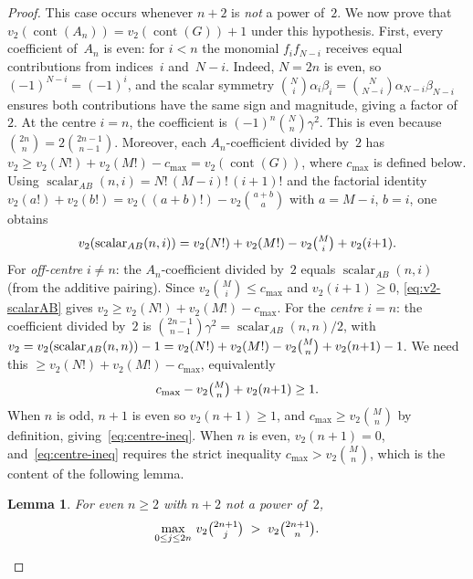 \documentclass[10pt]{amsart}
\newtheorem{lemma}[theorem]{Lemma}
\theoremstyle{definition}
\theoremstyle{remark}
\DeclareMathOperator{\cont}{cont}
\begin{document}
\begin{proof}
This case occurs whenever $n+2$ is \emph{not} a power of~$2$.
We now prove that $v_2(\cont(A_n)) = v_2(\cont(G))+1$ under this
hypothesis.  First, every coefficient of~$A_n$ is even: for $i<n$
the monomial $f_if_{N-i}$ receives equal contributions from
indices~$i$ and~$N{-}i$.  Indeed, $N=2n$ is even, so
$(-1)^{N-i}=(-1)^i$, and the scalar symmetry
$\binom{N}{i}\alpha_i\beta_i = \binom{N}{N{-}i}\alpha_{N-i}\beta_{N-i}$
ensures both contributions have the same sign and magnitude,
giving a factor of~$2$.  At the centre $i=n$, the coefficient is
$(-1)^n\binom{N}{n}\gamma^2$.  This is even because
$\binom{2n}{n}=2\binom{2n{-}1}{n{-}1}$.
Moreover, each $A_n$-coefficient divided by~$2$ has
$v_2 \ge v_2(N!) + v_2(M!) - c_{\max} = v_2(\cont(G))$,
where $c_{\max}$ is defined below.
Using $\operatorname{scalar}_{AB}(n,i) = N!\,(M{-}i)!\,(i{+}1)!$
and the factorial identity
$v_2(a!) + v_2(b!) = v_2((a{+}b)!) - v_2\binom{a+b}{a}$
with $a=M{-}i$, $b=i$, one obtains
\begin{equation}\label{eq:v2-scalarAB}
v_2(\operatorname{scalar}_{AB}(n,i))
  = v_2(N!) + v_2(M!) - v_2\tbinom{M}{i} + v_2(i{+}1).
\end{equation}
For \emph{off-centre} $i \ne n$:
the $A_n$-coefficient divided by~$2$ equals
$\operatorname{scalar}_{AB}(n,i)$ (from the additive pairing).
Since $v_2\binom{M}{i} \le c_{\max}$ and $v_2(i{+}1) \ge 0$,
\eqref{eq:v2-scalarAB} gives
$v_2 \ge v_2(N!) + v_2(M!) - c_{\max}$.
For the \emph{centre} $i=n$:
the coefficient divided by~$2$ is
$\binom{2n{-}1}{n{-}1}\gamma^2 = \operatorname{scalar}_{AB}(n,n)/2$,
with
$v_2 = v_2(\operatorname{scalar}_{AB}(n,n)) - 1
     = v_2(N!) + v_2(M!) - v_2\tbinom{M}{n} + v_2(n{+}1) - 1$.
We need this $\ge v_2(N!) + v_2(M!) - c_{\max}$,
equivalently
\begin{equation}\label{eq:centre-ineq}
c_{\max} - v_2\tbinom{M}{n} + v_2(n{+}1) \ge 1.
\end{equation}
When $n$ is odd, $n{+}1$ is even so $v_2(n{+}1) \ge 1$,
and $c_{\max} \ge v_2\binom{M}{n}$ by definition,
giving~\eqref{eq:centre-ineq}.
When $n$ is even, $v_2(n{+}1) = 0$,
and~\eqref{eq:centre-ineq} requires the strict inequality
$c_{\max} > v_2\binom{M}{n}$,
which is the content of the following lemma.

\begin{lemma}\label{lem:centre-not-max}
For even $n \ge 2$ with $n+2$ not a power of~$2$,
\[
\max_{0 \le j \le 2n}\, v_2\tbinom{2n+1}{j}
\;>\; v_2\tbinom{2n+1}{n}.
\]
\end{lemma}


\end{proof}
\end{document}
